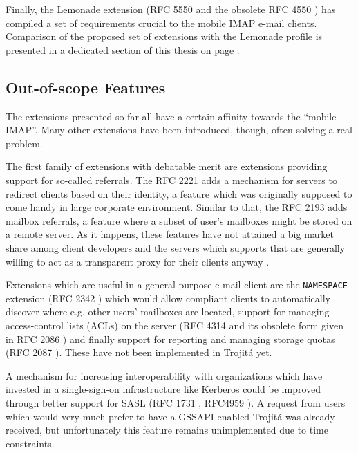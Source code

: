 \documentclass[trojita]{subfiles}
\begin{document}
Finally, the Lemonade extension (RFC 5550 \cite{rfc5550} and the obsolete RFC 4550 \cite{rfc4550}) has compiled a set of
requirements crucial to the mobile IMAP e-mail clients.  Comparison of the proposed set of extensions with the Lemonade
profile is presented in a dedicated section of this thesis on page \pageref{sec:lemonade-comparison}.

\subsection{Out-of-scope Features}

The extensions presented so far all have a certain affinity towards the ``mobile IMAP''.  Many other extensions have
been introduced, though, often solving a real problem.

The first family of extensions with debatable merit are extensions providing support for so-called referrals.  The RFC
2221 \cite{rfc2221} adds a mechanism for servers to redirect clients based on their identity, a feature which was
originally supposed to come handy in large corporate environment.  Similar to that, the RFC 2193 \cite{rfc2193} adds
mailbox referrals, a feature where a subset of user's mailboxes might be stored on a remote server.  As it happens,
these features have not attained a big market share among client developers \cite{thunderbird-referrals} and the servers
which supports that are generally willing to act as a transparent proxy for their clients anyway
\cite{cyrus-referral-proxy}.

Extensions which are useful in a general-purpose e-mail client are the {\tt NAMESPACE} extension (RFC 2342
\cite{rfc2342}) which would allow compliant clients to automatically discover where e.g. other users' mailboxes are
located, support for managing access-control lists (ACLs) on the server (RFC 4314 \cite{rfc4314} and its obsolete form
given in RFC 2086 \cite{rfc2086}) and finally support for reporting and managing storage quotas (RFC 2087
\cite{rfc2087}).  These have not been implemented in Trojitá yet.

A mechanism for increasing interoperability with organizations which have invested in a single-sign-on infrastructure
like Kerberos could be improved through better support for SASL (RFC 1731 \cite{rfc1731}, RFC4959 \cite{rfc4959}).  A
request from users which would very much prefer to have a GSSAPI-enabled Trojitá was already received, but unfortunately
this feature remains unimplemented due to time constraints.
\end{document}

